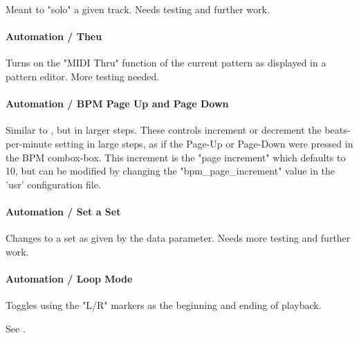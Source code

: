    Meant to "solo" a given track.
   Needs testing and further work.

\paragraph{Automation / Theu}
\label{paragraph:configuration_midi_ctrl_thru}

   Turns on the "MIDI Thru" function of the current pattern as displayed in a
   pattern editor.  More testing needed.

\paragraph{Automation / BPM Page Up and Page Down}
\label{paragraph:configuration_midi_ctrl_bpmpageupdn}

   Similar to
   , but in
   larger steps.
   These controls increment or decrement the beats-per-minute setting
   in large steps, as if
   the Page-Up or Page-Down were pressed in the BPM combox-box.
   This increment is the
   "page increment" which defaults to 10, but can be modified by
   changing the "bpm\_page\_increment" value in the 'usr'
   configuration file.

\paragraph{Automation / Set a Set}
\label{paragraph:configuration_midi_set_a_set}

   Changes to a set as given by the data parameter.
   Needs more testing and further work.



\paragraph{Automation / Loop Mode}
\label{paragraph:configuration_midi_loop_mode}

   Toggles using the "L/R" markers as the beginning and ending
   of playback.

   See .

